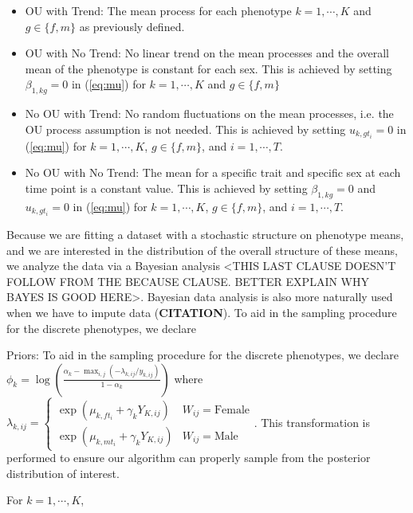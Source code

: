 \documentclass[
  12pt,
]{article}
\begin{document}
\begin{itemize}
\item OU with Trend: The mean process for each phenotype $k=1,\cdots,K$ and $g \in \{f,m\}$ as previously defined.
\item OU with No Trend: No linear trend on the mean processes and the overall mean of the phenotype is constant for each sex. This is achieved by setting $\beta_{1,kg} = 0$ in (\ref{eq:mu}) for $k = 1,\cdots,K$ and $g \in \{f,m\}$
\item No OU with Trend: No random fluctuations on the mean processes, i.e. the OU process assumption is not needed. This is achieved by setting $u_{k,gt_i} = 0$ in (\ref{eq:mu}) for $k = 1,\cdots,K$, $g \in \{f,m\}$, and $i = 1,\cdots,T$.
\item No OU with No Trend: The mean for a specific trait and specific sex at each time point is a constant value. This is achieved by setting $\beta_{1,kg} = 0$ and $u_{k,gt_i} = 0$ in (\ref{eq:mu}) for $k = 1,\cdots,K$, $g \in \{f,m\}$, and $i = 1,\cdots,T$.
\end{itemize}

Because we are fitting a dataset with a stochastic structure on
phenotype means, and we are interested in the distribution of the
overall structure of these means, we analyze the data via a Bayesian
analysis \textless THIS LAST CLAUSE DOESN'T FOLLOW FROM THE BECAUSE
CLAUSE. BETTER EXPLAIN WHY BAYES IS GOOD HERE\textgreater. Bayesian data
analysis is also more naturally used when we have to impute data
(\textbf{CITATION}). To aid in the sampling procedure for the discrete
phenotypes, we declare

Priors: To aid in the sampling procedure for the discrete phenotypes, we
declare
\(\phi_k = \log\left(\frac{\alpha_k - \max_{i,j}(-\lambda_{k,ij}/y_{k,ij})}{1 - \alpha_k}\right)\)
where
\(\lambda_{k,ij} = \left\{\begin{array}{cc} \exp(\mu_{k,ft_i} + \gamma_k Y_{K,ij}) & W_{ij} = \text{Female} \\ \exp(\mu_{k,mt_i} + \gamma_k Y_{K,ij}) & W_{ij} = \text{Male} \end{array}\right.\).
This transformation is performed to ensure our algorithm can properly
sample from the posterior distribution of interest.

For \(k = 1,\cdots,K\),
\end{document}
